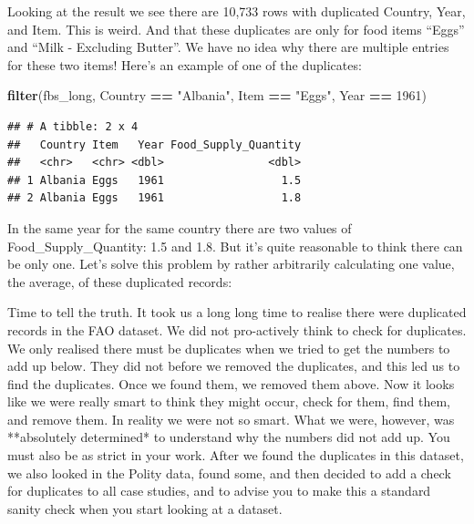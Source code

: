 \documentclass[]{book}
\makeatletter
\newenvironment{Shaded}{\begin{snugshade}}{\end{snugshade}}
\newcommand{\DataTypeTok}[1]{\textcolor[rgb]{0.13,0.29,0.53}{#1}}
\newcommand{\DecValTok}[1]{\textcolor[rgb]{0.00,0.00,0.81}{#1}}
\newcommand{\KeywordTok}[1]{\textcolor[rgb]{0.13,0.29,0.53}{\textbf{#1}}}
\newcommand{\NormalTok}[1]{#1}
\newcommand{\OperatorTok}[1]{\textcolor[rgb]{0.81,0.36,0.00}{\textbf{#1}}}
\newcommand{\StringTok}[1]{\textcolor[rgb]{0.31,0.60,0.02}{#1}}
\newenvironment{kframe}{%
\medskip{}
\setlength{\fboxsep}{.8em}
 \def\at@end@of@kframe{}%
 \ifinner\ifhmode%
  \def\at@end@of@kframe{\end{minipage}}%
  \begin{minipage}{\columnwidth}%
 \fi\fi%
 \def\FrameCommand##1{\hskip\@totalleftmargin \hskip-\fboxsep
 \colorbox{shadecolor}{##1}\hskip-\fboxsep
     \hskip-\linewidth \hskip-\@totalleftmargin \hskip\columnwidth}%
 \MakeFramed {\advance\hsize-\width
   \@totalleftmargin\z@ \linewidth\hsize
   \@setminipage}}%
 {\par\unskip\endMakeFramed%
 \at@end@of@kframe}
\newenvironment{rmdblock}[1]
  {
  \begin{itemize}
  \renewcommand{\labelitemi}{
    \raisebox{-.7\height}[0pt][0pt]{
      {\setkeys{Gin}{width=3em,keepaspectratio}\texttt{[image: images/\#1]}}
    }
  }
  \setlength{\fboxsep}{1em}
  \begin{kframe}
  \item
  }
  {
  \end{kframe}
  \end{itemize}
  }
\newenvironment{info}
  {\begin{rmdblock}{info}}
  {\end{rmdblock}}
\makeatother
\begin{document}
Looking at the result we see there are 10,733 rows with duplicated Country, Year, and Item. This is weird. And that these duplicates are only for food items ``Eggs'' and ``Milk - Excluding Butter''. We have no idea why there are multiple entries for these two items! Here's an example of one of the duplicates:

\begin{Shaded}
\begin{Highlighting}[]
\KeywordTok{filter}\NormalTok{(fbs_long,}
\NormalTok{       Country }\OperatorTok{==}\StringTok{ "Albania"}\NormalTok{,}
\NormalTok{       Item }\OperatorTok{==}\StringTok{ "Eggs"}\NormalTok{,}
\NormalTok{       Year }\OperatorTok{==}\StringTok{ }\DecValTok{1961}\NormalTok{)}
\end{Highlighting}
\end{Shaded}

\begin{verbatim}
## # A tibble: 2 x 4
##   Country Item   Year Food_Supply_Quantity
##   <chr>   <chr> <dbl>                <dbl>
## 1 Albania Eggs   1961                  1.5
## 2 Albania Eggs   1961                  1.8
\end{verbatim}

In the same year for the same country there are two values of Food\_Supply\_Quantity: 1.5 and 1.8. But it's quite reasonable to think there can be only one. Let's solve this problem by rather arbitrarily calculating one value, the average, of these duplicated records:

\begin{Shaded}
\end{Shaded}

\begin{info}
Time to tell the truth. It took us a long long time to realise there
were duplicated records in the FAO dataset. We did not pro-actively
think to check for duplicates. We only realised there must be duplicates
when we tried to get the numbers to add up below. They did not before we
removed the duplicates, and this led us to find the duplicates. Once we
found them, we removed them above. Now it looks like we were really
smart to think they might occur, check for them, find them, and remove
them. In reality we were not so smart. What we were, however, was
**absolutely determined* to understand why the numbers did not add up.
You must also be as strict in your work. After we found the duplicates
in this dataset, we also looked in the Polity data, found some, and then
decided to add a check for duplicates to all case studies, and to advise
you to make this a standard sanity check when you start looking at a
dataset.
\end{info}
\end{document}
